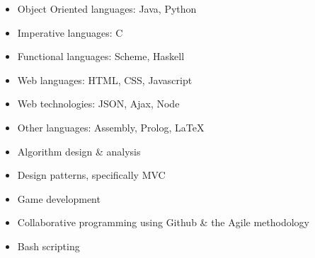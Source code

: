 \documentclass[]{friggeri-cv} %
\begin{document}
\begin{minipage}[t]{0.5\textwidth}
\begin{itemize}
\item{Object Oriented languages: Java, Python}
\item{Imperative languages: C}
\item{Functional languages: Scheme, Haskell}
\item{Web languages: HTML, CSS, Javascript}
\item{Web technologies: JSON, Ajax, Node}
\item{Other languages: Assembly, Prolog, \LaTeX}
\end{itemize}
\end{minipage}
\begin{minipage}[t]{0.5\textwidth}
\begin{itemize}
\item{Algorithm design \& analysis}
\item{Design patterns, specifically MVC}
\item{Game development}
\item{Collaborative programming using Github \& the Agile methodology}
\item{Bash scripting}
\end{itemize}
\end{minipage}
\vspace{0.7em}

\end{document}

